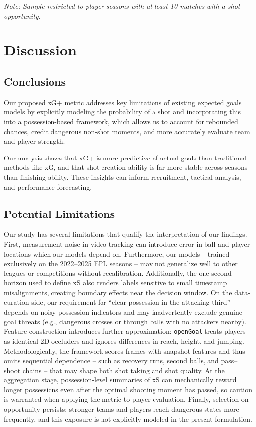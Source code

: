 \documentclass[12pt,letterpaper]{article}
\begin{document}
\begin{table}[ht!]
\vspace{0.2cm}
\footnotesize\emph{Note: Sample restricted to player-seasons with at least 10 matches with a shot opportunity.}
\end{table}


\newpage

\section{Discussion}

\subsection{Conclusions}

Our proposed xG+ metric addresses key limitations of existing expected goals models by explicitly modeling the probability of a shot and incorporating this into a possession-based framework, which allows us to account for rebounded chances, credit dangerous non-shot moments, and more accurately evaluate team and player strength.

Our analysis shows that xG+ is more predictive of actual goals than traditional methods like xG, and that shot creation ability is far more stable across seasons than finishing ability. These insights can inform recruitment, tactical analysis, and performance forecasting.

\subsection{Potential Limitations}

Our study has several limitations that qualify the interpretation of our findings. First, measurement noise in video tracking can introduce error in ball and player locations which our models depend on. Furthermore, our models -- trained exclusively on the 2022–2025 EPL seasons -- may not generalize well to other leagues or competitions without recalibration. Additionally, the one-second horizon used to define xS also renders labels sensitive to small timestamp misalignments, creating boundary effects near the decision window. On the data-curation side, our requirement for “clear possession in the attacking third” depends on noisy possession indicators and may inadvertently exclude genuine goal threats (e.g., dangerous crosses or through balls with no attackers nearby). Feature construction introduces further approximation: \texttt{openGoal} treats players as identical 2D occluders and ignores differences in reach, height, and jumping. Methodologically, the framework scores frames with snapshot features and thus omits sequential dependence -- such as recovery runs, second balls, and pass–shoot chains -- that may shape both shot taking and shot quality. At the aggregation stage, possession-level summaries of xS can mechanically reward longer possessions even after the optimal shooting moment has passed, so caution is warranted when applying the metric to player evaluation. Finally, selection on opportunity persists: stronger teams and players reach dangerous states more frequently, and this exposure is not explicitly modeled in the present formulation.
\end{document}
